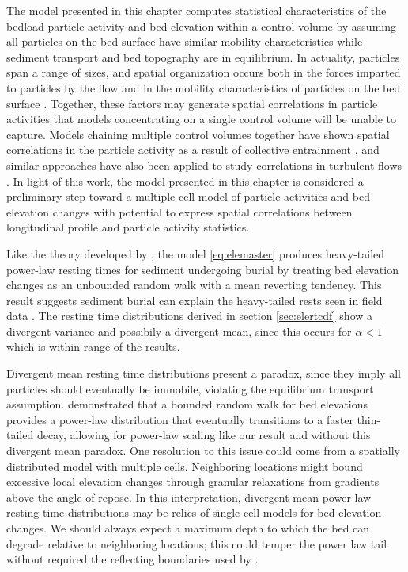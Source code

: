 The model presented in this chapter computes statistical characteristics of the bedload particle activity and bed elevation within a control volume by assuming all particles on the bed surface have similar mobility characteristics while sediment transport and bed topography are in equilibrium. In actuality, particles span a range of sizes, and spatial organization occurs both in the forces imparted to particles by the flow \citep{Shih2017,Amir2014} and in the mobility characteristics of particles on the bed surface \citep{Charru2004, Hassan2008, Nelson2014}.
Together, these factors may generate spatial correlations in particle activities that models concentrating on a single control volume will be unable to capture. 
Models chaining multiple control volumes together have shown spatial correlations in the particle activity as a result of collective entrainment \citep{Heyman2014, Ancey2015}, and similar approaches have also been applied to study correlations in turbulent flows \citep{Gardiner1983}. In light of this work, the model presented in this chapter is considered a preliminary step toward a multiple-cell model of particle activities and bed elevation changes with potential to express spatial correlations between longitudinal profile and particle activity statistics.

Like the theory developed by \citet{Martin2014}, the model \ref{eq:elemaster} produces heavy-tailed power-law resting times for sediment undergoing burial by treating bed elevation changes as an unbounded random walk with a mean reverting tendency.
This result suggests sediment burial can explain the heavy-tailed rests seen in field data \citep{Olinde2015,Bradley2017,Pretzlav2016a}. 
The resting time distributions derived in section \ref{sec:elertcdf} show a divergent variance and possibily a divergent mean, since this occurs for $\alpha < 1$ \citep{Sornette2006} which is within range of the results.

Divergent mean resting time distributions present a paradox, since they imply all particles should eventually be immobile, violating the equilibrium transport assumption.
\citet{Voepel2013} demonstrated that a bounded random walk for bed elevations provides a power-law distribution that eventually transitions to a faster thin-tailed decay, allowing for power-law scaling like our result and \citet{Martin2014} without this divergent mean paradox. 
One resolution to this issue could come from a spatially distributed model with multiple cells.
Neighboring locations might bound excessive local elevation changes through granular relaxations from gradients above the angle of repose.
In this interpretation, divergent mean power law resting time distributions may be relics of single cell models for bed elevation changes.
We should always expect a maximum depth to which the bed can degrade relative to neighboring locations; this could temper the power law tail without required the reflecting boundaries used by \citet{Voepel2013}.

